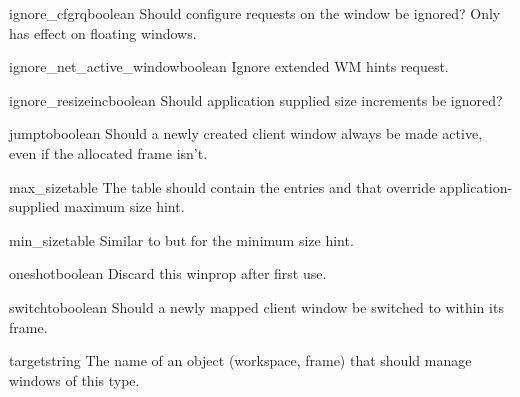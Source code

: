 \begin{winprop}{ignore_cfgrq}{boolean}
    Should configure requests on the window be ignored?
    Only has effect on floating windows.
\end{winprop}


\begin{winprop}{ignore_net_active_window}{boolean}
    Ignore extended WM hints  request. 
\end{winprop}


\begin{winprop}{ignore_resizeinc}{boolean}
    Should application supplied size increments be ignored?
\end{winprop}


\begin{winprop}{jumpto}{boolean}
    Should a newly created client window always be made
    active, even if the allocated frame isn't. 
\end{winprop}


\begin{winprop}{max_size}{table}
    The table should contain the entries  and  that
    override application-supplied maximum size hint. 
\end{winprop}


\begin{winprop}{min_size}{table}
    Similar to  but for the minimum size hint. 
\end{winprop}


\begin{winprop}{oneshot}{boolean}
    Discard this winprop after first use. 
\end{winprop}


\begin{winprop}{switchto}{boolean}
    Should a newly mapped client window be switched to within
    its frame.
\end{winprop}
        

\begin{winprop}{target}{string}
    The name of an object (workspace, frame) that should manage 
    windows of this type. 
\end{winprop}

